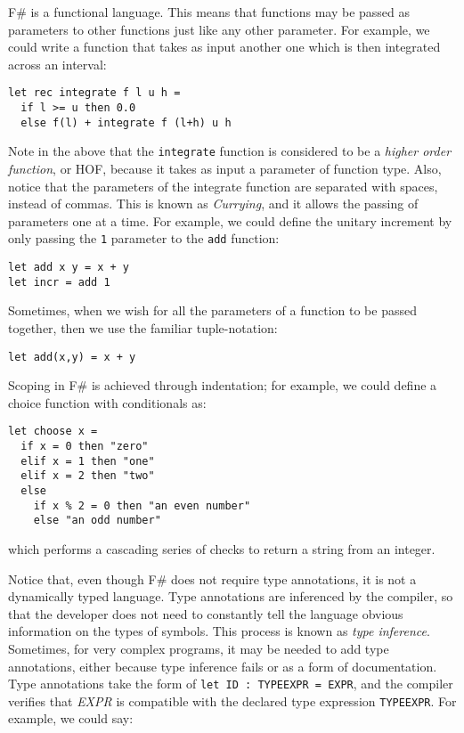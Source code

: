 F\# is a functional language. This means that functions may be passed as parameters to other functions just like any other parameter. For example, we could write a function that takes as input another one which is then integrated across an interval:

\begin{lstlisting}
let rec integrate f l u h = 
  if l >= u then 0.0
  else f(l) + integrate f (l+h) u h
\end{lstlisting}

Note in the above that the \texttt{integrate} function is considered to be a \textit{higher order function}, or HOF, because it takes as input a parameter of function type. Also, notice that the parameters of the integrate function are separated with spaces, instead of commas. This is known as \textit{Currying}, and it allows the passing of parameters one at a time. For example, we could define the unitary increment by only passing the \texttt{1} parameter to the \texttt{add} function:

\begin{lstlisting}
let add x y = x + y
let incr = add 1
\end{lstlisting}

Sometimes, when we wish for all the parameters of a function to be passed together, then we use the familiar tuple-notation:

\begin{lstlisting}
let add(x,y) = x + y
\end{lstlisting}

Scoping in F\# is achieved through indentation; for example, we could define a choice function with conditionals as:

\begin{lstlisting}
let choose x =
  if x = 0 then "zero"
  elif x = 1 then "one"
  elif x = 2 then "two"
  else 
    if x % 2 = 0 then "an even number"
    else "an odd number"
\end{lstlisting}

which performs a cascading series of checks to return a string from an integer.

Notice that, even though F\# does not require type annotations, it is not a dynamically typed language. Type annotations are inferenced by the compiler, so that the developer does not need to constantly tell the language obvious information on the types of symbols. This process is known as \textit{type inference}. Sometimes, for very complex programs, it may be needed to add type annotations, either because type inference fails or as a form of documentation. Type annotations take the form of \texttt{let ID : TYPEEXPR = EXPR}, and the compiler verifies that \textit{EXPR} is compatible with the declared type expression \texttt{TYPEEXPR}. For example, we could say:

